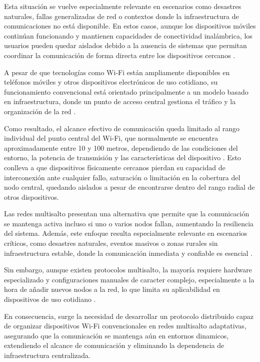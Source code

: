 \documentclass[12pt,oneside]{scrreprt}
\begin{document}
Esta situación se vuelve especialmente relevante en escenarios como desastres naturales, fallas generalizadas de red o contextos donde la infraestructura de comunicaciones no está disponible. En estos casos, aunque los dispositivos móviles continúan funcionando y mantienen capacidades de conectividad inalámbrica, los usuarios pueden quedar aislados debido a la ausencia de sistemas que permitan coordinar la comunicación de forma directa entre los dispositivos cercanos \parencite{Akyildiz2005}.

A pesar de que tecnologías como Wi-Fi están ampliamente disponibles en teléfonos móviles y otros dispositivos electrónicos de uso cotidiano, su funcionamiento convencional está orientado principalmente a un modelo basado en infraestructura, donde un punto de acceso central gestiona el tráfico y la organización de la red \parencite{IEEE2020}.

Como resultado, el alcance efectivo de comunicación queda limitado al rango individual del punto central del Wi-Fi, que normalmente se encuentra aproximadamente entre 10 y 100 metros, dependiendo de las condiciones del entorno, la potencia de transmisión y las características del dispositivo \parencite{Gupta2000}. Esto conlleva a que dispositivos físicamente cercanos pierdan su capacidad de interconexión ante cualquier fallo, saturación o limitación en la cobertura del nodo central, quedando aislados a pesar de encontrarse dentro del rango radial de otros dispositivos.

Las redes multisalto presentan una alternativa que permite que la comunicación se mantenga activa incluso si uno o varios nodos fallan, aumentando la resiliencia del sistema. Además, este enfoque resulta especialmente relevante en escenarios críticos, como desastres naturales, eventos masivos o zonas rurales sin infraestructura estable, donde la comunicación inmediata y confiable es esencial \parencite{Akyildiz2005}.

Sin embargo, aunque existen protocolos multisalto, la mayoría requiere hardware especializado y configuraciones manuales de caracter complejo, especialmente a la hora de añadir nuevos nodos a la red, lo que limita su aplicabilidad en dispositivos de uso cotidiano \parencite{IEEE2020}.

En consecuencia, surge la necesidad de desarrollar un protocolo distribuido capaz de organizar dispositivos Wi-Fi convencionales en redes multisalto adaptativas, asegurando que la comunicación se mantenga aún en entornos dinamicos, extendiendo el alcance de comunicación y eliminando la dependencia de infraestructura centralizada.
\end{document}

